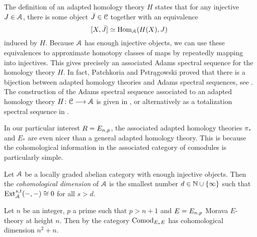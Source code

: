\begin{remark}
    The definition of an adapted homology theory $H$ states that for any injective $J\in \EuScript{A}$, there is some object $\bar{J}\in \EuScript{C}$ together with an equivalence 
    \[[X,\bar{J}]\simeq \operatorname{Hom}_{\EuScript{A}}(H(X), J)\] 
    induced by $H$. Because $\EuScript{A}$ has enough injective objects, we can use these equivalences to approximate homotopy classes of maps by repeatedly mapping into injectives. This gives precisely an associated Adams spectral sequence for the homology theory $H$. In fact, Patchkoria and Pstr{\k a}gowski proved that there is a bijection between adapted homology theories and Adams spectral sequences, see \cite[3.24, 3.25]{patchkoria-pstragowski_2021}. The construction of the Adams spectral sequence associated to an adapted homology theory $H\colon \EuScript{C}\longrightarrow \EuScript{A}$ is given in \cite[2.24]{patchkoria-pstragowski_2021}, or alternatively as a totalization spectral sequence in \cite[2.27]{patchkoria-pstragowski_2021}. 
\end{remark}

In our particular interest $R=E_{n,p}$, the associated adapted homology theories $\pi_*$ and $E_*$ are even nicer than a general adapted homology theory. This is because the cohomological information in the associated category of comodules is particularly simple. 

\begin{definition}
    \label{ch1:def:cohomological-dimension}
    Let $\EuScript{A}$ be a locally graded abelian category with enough injective objects. Then the \emph{cohomological dimension} of $\EuScript{A}$ is the smallest number $d\in \mathbb{N}\cup \{\infty\}$ such that $\operatorname{Ext}^{s,t}_{\EuScript{A}}(-,-) \cong 0$ for all $s>d$. 
\end{definition}

\begin{example}
    \label{ch1:ex:cohomological-dimension-comodEE}
    Let $n$ be an integer, $p$ a prime such that $p>n+1$ and $E=E_{n,p}$ Morava $E$-theory at height $n$. Then by \cite[2.5]{pstragowski_2021} the category $\mathrm{Comod}_{E_*E}$ has cohomological dimension $n^2+n$. 
\end{example}

